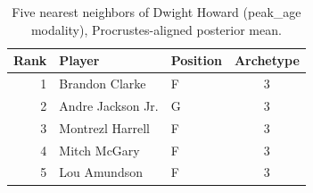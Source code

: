 \begin{table}[htbp]
  \centering\small
  \begin{tabular}{rllc}
    \toprule
    Rank & Player & Position & Archetype \\
    \midrule
    1 & Brandon Clarke & F & 3 \\
    2 & Andre Jackson Jr. & G & 3 \\
    3 & Montrezl Harrell & F & 3 \\
    4 & Mitch McGary & F & 3 \\
    5 & Lou Amundson & F & 3 \\
    \bottomrule
  \end{tabular}
  \caption{Five nearest neighbors of Dwight Howard (peak_age modality), Procrustes-aligned posterior mean.}
  \label{tab:Dwight_Howard_neighbors_peak_age}
\end{table}

